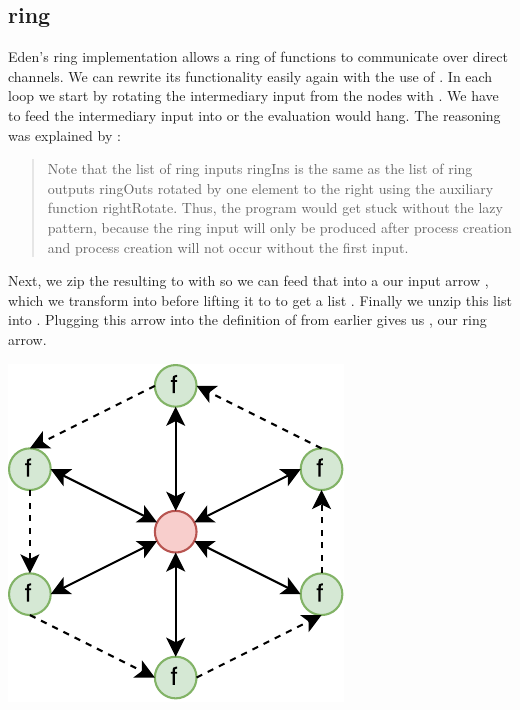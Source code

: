 \subsection{ring}
Eden's ring implementation allows a ring of functions to communicate over direct channels. We can rewrite its functionality easily again with the use of . In each loop we start by rotating the intermediary input from the nodes \code{[fut r]} with . We have to feed the intermediary input into  or the evaluation would hang. The reasoning was explained by \cite{eden_cefp}:
\begin{quotation}
Note that the list of ring inputs ringIns is the same as the list of ring outputs ringOuts rotated by one element to the right using the auxiliary function rightRotate. Thus, the program would get stuck without the lazy pattern, because the ring input will only be produced after process creation and process creation will not occur without the first input.
\end{quotation}
Next, we zip the resulting \code{([i], [fut r])} to \code{[(i, fut r)]} with  so we can feed that into a our input arrow , which we transform into  before lifting it to  to get a list \code{[(o, fut r)]}. Finally we unzip this list into \code{([o], [fut r])}. Plugging this arrow  into the definition of  from earlier gives us , our ring arrow.
\begin{center}
	\includegraphics[scale=0.75]{images/ring}
\end{center}
